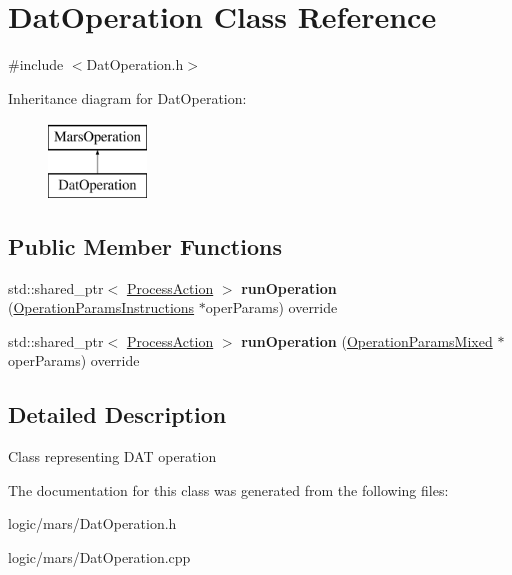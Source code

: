 \hypertarget{classDatOperation}{}\section{Dat\+Operation Class Reference}
\label{classDatOperation}


{\ttfamily \#include $<$Dat\+Operation.\+h$>$}

Inheritance diagram for Dat\+Operation\+:\begin{figure}[H]
\begin{center}
\leavevmode
\includegraphics[height=2.000000cm]{classDatOperation}
\end{center}
\end{figure}
\subsection*{Public Member Functions}
\begin{DoxyCompactItemize}
\item 
\mbox{\label{classDatOperation_a74db792f5ae0c4ea2686b984c671b677}} 
std\+::shared\+\_\+ptr$<$ \hyperlink{classProcessAction}{Process\+Action} $>$ {\bfseries run\+Operation} (\hyperlink{classOperationParamsInstructions}{Operation\+Params\+Instructions} $\ast$oper\+Params) override
\item 
\mbox{\label{classDatOperation_a89124956b4683f8f9c5932de0ad239b1}} 
std\+::shared\+\_\+ptr$<$ \hyperlink{classProcessAction}{Process\+Action} $>$ {\bfseries run\+Operation} (\hyperlink{classOperationParamsMixed}{Operation\+Params\+Mixed} $\ast$oper\+Params) override
\end{DoxyCompactItemize}


\subsection{Detailed Description}
Class representing D\+AT operation 

The documentation for this class was generated from the following files\+:\begin{DoxyCompactItemize}
\item 
logic/mars/Dat\+Operation.\+h\item 
logic/mars/Dat\+Operation.\+cpp\end{DoxyCompactItemize}
